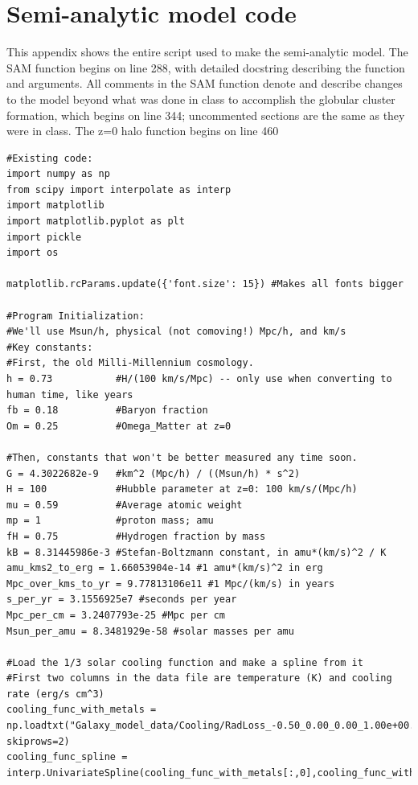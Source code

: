 \documentclass[onecolumn]{aastex62}
\begin{document}



\appendix



\section{Semi-analytic model code}
This appendix shows the entire script used to make the semi-analytic model.  The SAM function begins on line 288, with detailed docstring describing the function and arguments.  All comments in the SAM function denote and describe changes to the model beyond what was done in class to accomplish the globular cluster formation, which begins on line 344; uncommented sections are the same as they were in class.  The z=0 halo function begins on line 460

\begin{verbatim}
#Existing code:
import numpy as np
from scipy import interpolate as interp
import matplotlib
import matplotlib.pyplot as plt
import pickle
import os

matplotlib.rcParams.update({'font.size': 15}) #Makes all fonts bigger

#Program Initialization:
#We'll use Msun/h, physical (not comoving!) Mpc/h, and km/s
#Key constants:
#First, the old Milli-Millennium cosmology.
h = 0.73           #H/(100 km/s/Mpc) -- only use when converting to human time, like years
fb = 0.18          #Baryon fraction
Om = 0.25          #Omega_Matter at z=0

#Then, constants that won't be better measured any time soon.
G = 4.3022682e-9   #km^2 (Mpc/h) / ((Msun/h) * s^2)
H = 100            #Hubble parameter at z=0: 100 km/s/(Mpc/h)
mu = 0.59          #Average atomic weight
mp = 1             #proton mass; amu
fH = 0.75          #Hydrogen fraction by mass
kB = 8.31445986e-3 #Stefan-Boltzmann constant, in amu*(km/s)^2 / K
amu_kms2_to_erg = 1.66053904e-14 #1 amu*(km/s)^2 in erg
Mpc_over_kms_to_yr = 9.77813106e11 #1 Mpc/(km/s) in years
s_per_yr = 3.1556925e7 #seconds per year
Mpc_per_cm = 3.2407793e-25 #Mpc per cm
Msun_per_amu = 8.3481929e-58 #solar masses per amu

#Load the 1/3 solar cooling function and make a spline from it
#First two columns in the data file are temperature (K) and cooling rate (erg/s cm^3)
cooling_func_with_metals = np.loadtxt("Galaxy_model_data/Cooling/RadLoss_-0.50_0.00_0.00_1.00e+00.rates", skiprows=2)
cooling_func_spline = interp.UnivariateSpline(cooling_func_with_metals[:,0],cooling_func_with_metals[:,1],s=0)


\end{verbatim}
\end{document}
